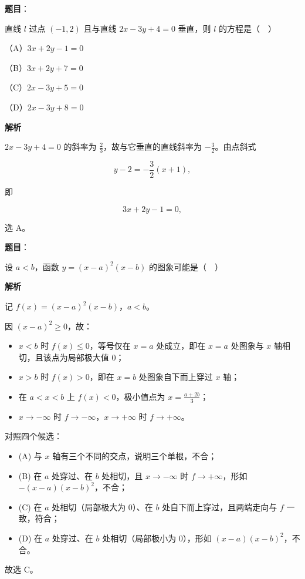 \begin{answer}

\textbf{题目}：

直线 $l$ 过点 $(-1,2)$ 且与直线 $2x-3y+4=0$ 垂直，则 $l$ 的方程是（　）

（A）$3x+2y-1=0$

（B）$3x+2y+7=0$

（C）$2x-3y+5=0$

（D）$2x-3y+8=0$

\textbf{解析}

$2x-3y+4=0$ 的斜率为 $\frac23$，故与它垂直的直线斜率为 $-\frac32$。由点斜式

\nopagebreak[4]
\[y-2=-\frac32(x+1),\]

即

\nopagebreak[4]
\[3x+2y-1=0,\]

选 A。


\end{answer}
\begin{answer}

\textbf{题目}：

设 $a<b$，函数 $y=(x-a)^2(x-b)$ 的图象可能是（　）
\nopagebreak[4]
\begin{center}\end{center}
\nopagebreak[4]
\textbf{解析}

记 $f(x)=(x-a)^2(x-b)$，$a<b$。

因 $(x-a)^2\geqslant0$，故：

\begin{itemize}
\item $x<b$ 时 $f(x)\leqslant0$，等号仅在 $x=a$ 处成立，即在 $x=a$ 处图象与 $x$ 轴相切，且该点为局部极大值 $0$；
\item $x>b$ 时 $f(x)>0$，即在 $x=b$ 处图象自下而上穿过 $x$ 轴；
\item 在 $a<x<b$ 上 $f(x)<0$，极小值点为 $x=\frac{a+2b}{3}$；
\item $x\to-\infty$ 时 $f\to-\infty$，$x\to+\infty$ 时 $f\to+\infty$。
\end{itemize}

对照四个候选：

\begin{itemize}
\item (A) 与 $x$ 轴有三个不同的交点，说明三个单根，不合；
\item (B) 在 $a$ 处穿过、在 $b$ 处相切，且 $x\to-\infty$ 时 $f\to+\infty$，形如 $-(x-a)(x-b)^2$，不合；
\item (C) 在 $a$ 处相切（局部极大为 $0$）、在 $b$ 处自下而上穿过，且两端走向与 $f$ 一致，符合；
\item (D) 在 $a$ 处穿过、在 $b$ 处相切（局部极小为 $0$），形如 $(x-a)(x-b)^2$，不合。
\end{itemize}

故选 C。


\end{answer}
